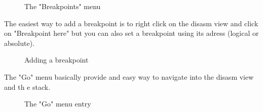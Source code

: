 \documentclass[10pt]{report}
\begin{document}
\begin{figure}[H]
\centering
{}
\caption{The "Breakpoints" menu}
\end{figure}
The easiest way to add a breakpoint is to right click on the disasm view and click on "Breakpoint here" but you can also set a breakpoint using its adress (logical or absolute).\newline
\begin{figure}[H]
\centering
{}
\caption{Adding a breakpoint}
\end{figure}

The "Go" menu basically provide and easy way to navigate into the disasm view and th e stack.\newline
\begin{figure}[H]
\centering
{}
\caption{The "Go" menu entry}
\end{figure}
\end{document}
